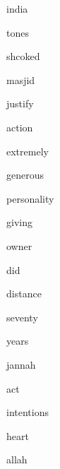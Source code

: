 \documentclass[varwidth]{standalone}
\begin{document}
\begin{CJK*}{UTF8}{gbsn}
{{{\colorbox{red!11.71674919128418}{\strut india}
\colorbox{red!4.593743324279785}{\strut tones}
\colorbox{red!13.44294261932373}{\strut shcoked}
\colorbox{red!13.93190860748291}{\strut masjid}
\colorbox{red!2.9140377044677734}{\strut justify}
\colorbox{red!4.248579978942871}{\strut action}
\colorbox{red!4.898979187011719}{\strut extremely}
\colorbox{red!5.680885314941406}{\strut generous}
\colorbox{red!4.026728630065918}{\strut personality}
\colorbox{red!8.314653396606445}{\strut giving}
\colorbox{red!5.511809825897217}{\strut owner}
\colorbox{red!12.418505668640137}{\strut did}
\colorbox{red!4.1832685470581055}{\strut distance}
\colorbox{red!8.270668029785156}{\strut seventy}
\colorbox{red!4.668243408203125}{\strut years}
\colorbox{red!13.590299606323242}{\strut jannah}
\colorbox{red!7.808178901672363}{\strut act}
\colorbox{red!3.738069534301758}{\strut intentions}
\colorbox{red!12.312119483947754}{\strut heart}
\colorbox{red!9.700902938842773}{\strut allah}

}}}
\end{CJK*}
\end{document}

